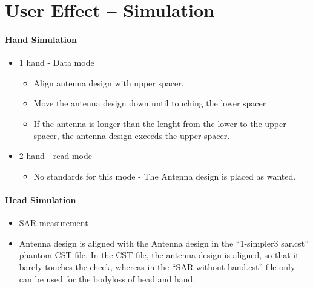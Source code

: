\chapter{User Effect -- Simulation}


\subsubsection{Hand Simulation}
\begin{itemize}
\item 1 hand - Data mode
\begin{itemize}
\item Align antenna design with upper spacer.
\item Move the antenna design down until touching the lower spacer
\item If the antenna is longer than the lenght from the lower to the upper spacer, the antenna design exceeds the upper spacer.
\end{itemize}
\item 2 hand - read mode
\begin{itemize}
\item No standards for this mode - The Antenna design is placed as wanted.  
\end{itemize}
\end{itemize}

\subsubsection{Head Simulation}
\begin{itemize}
\item SAR measurement
\item Antenna design is aligned with the Antenna design in the ``1-simpler3 sar.cst'' phantom CST file. In the CST file, the antenna design is aligned, so that it barely touches the cheek, whereas in the ``SAR without hand.cst'' file only can be used for the bodyloss of head and hand.
\end{itemize}
